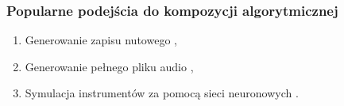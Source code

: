\documentclass[]{beamer}
\begin{document}
\begin{frame}
\begin{multicols}{2}
  \end{multicols}
\end{frame}

\begin{frame}
  \frametitle{Popularne podejścia do kompozycji algorytmicznej}

  \begin{enumerate}
    \item Generowanie zapisu nutowego \cite{language_models_drummers},
    \item Generowanie pełnego pliku audio \cite{riffusion},
    \item Symulacja instrumentów za pomocą sieci neuronowych \cite{nsynth}.
  \end{enumerate}
\end{frame}
\end{document}
